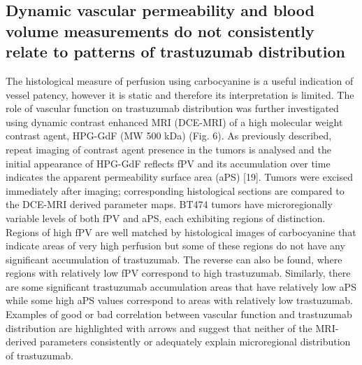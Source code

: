 \subsection{Dynamic vascular permeability and blood volume measurements do not consistently relate to patterns of trastuzumab distribution}

The histological measure of perfusion using carbocyanine is a useful indication of vessel patency, however it is static and therefore its interpretation is limited.
The role of vascular function on trastuzumab distribution was further investigated using dynamic contrast enhanced MRI (DCE-MRI) of a high molecular weight contrast agent, HPG-GdF (MW 500 kDa) (Fig.
6).
As previously described, repeat imaging of contrast agent presence in the tumors is analysed and the initial appearance of HPG-GdF reflects fPV and its accumulation over time indicates the apparent permeability surface area (aPS) [19].
Tumors were excised immediately after imaging; corresponding histological sections are compared to the DCE-MRI derived parameter maps.
BT474 tumors have microregionally variable levels of both fPV and aPS, each exhibiting regions of distinction.
Regions of high fPV are well matched by histological images of carbocyanine that indicate areas of very high perfusion but some of these regions do not have any significant accumulation of trastuzumab.
The reverse can also be found, where regions with relatively low fPV correspond to high trastuzumab.
Similarly, there are some significant trastuzumab accumulation areas that have relatively low aPS while some high aPS values correspond to areas with relatively low trastuzumab.
Examples of good or bad correlation between vascular function and trastuzumab distribution are highlighted with arrows and suggest that neither of the MRI-derived parameters consistently or adequately explain microregional distribution of trastuzumab.

